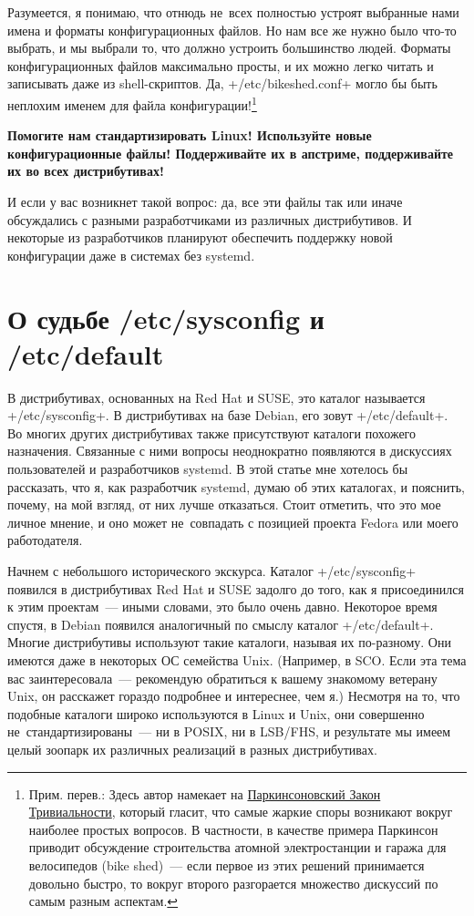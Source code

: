 \documentclass[10pt,oneside,a4paper]{article}
\begin{document}
Разумеется, я понимаю, что отнюдь не~всех полностью устроят выбранные нами имена
и форматы конфигурационных файлов. Но нам все же нужно было что-то выбрать, и мы
выбрали то, что должно устроить большинство людей. Форматы конфигурационных
файлов максимально просты, и их можно легко читать и записывать даже из
shell-скриптов. Да, +/etc/bikeshed.conf+ могло бы быть неплохим именем
для файла конфигурации!\footnote{Прим. перев.: Здесь автор намекает на
\href{http://en.wikipedia.org/wiki/Parkinson's_Law_of_Triviality}{Паркинсоновский
Закон Тривиальности}, который гласит, что самые жаркие споры возникают вокруг
наиболее простых вопросов. В частности, в качестве примера Паркинсон приводит
обсуждение строительства атомной электростанции и гаража для велосипедов (bike
shed)~--- если первое из этих решений принимается довольно быстро, то вокруг
второго разгорается множество дискуссий по самым разным аспектам.}

\textbf{Помогите нам стандартизировать Linux! Используйте новые конфигурационные
файлы! Поддерживайте их в апстриме, поддерживайте их во всех дистрибутивах!}

И если у вас возникнет такой вопрос: да, все эти файлы так или иначе
обсуждались с разными разработчиками из различных дистрибутивов. И некоторые из
разработчиков планируют обеспечить поддержку новой конфигурации даже в
системах без systemd.

\section{О судьбе /etc/sysconfig и /etc/default}

В дистрибутивах, основанных на Red Hat и SUSE, это каталог называется
+/etc/sysconfig+. В дистрибутивах на базе Debian, его зовут +/etc/default+.
Во многих других дистрибутивах также присутствуют каталоги похожего назначения.
Связанные с ними вопросы неоднократно появляются в дискуссиях пользователей и
разработчиков systemd. В этой статье мне хотелось бы рассказать, что я, как
разработчик systemd, думаю об этих каталогах, и пояснить, почему, на мой взгляд,
от них лучше отказаться. Стоит отметить, что это мое личное мнение, и оно
может не~совпадать с позицией проекта Fedora или моего работодателя.

Начнем с небольшого исторического экскурса. Каталог +/etc/sysconfig+ появился в
дистрибутивах Red Hat и SUSE задолго до того, как я присоединился к этим
проектам~--- иными словами, это было очень давно. 
Некоторое время спустя, в Debian появился аналогичный по смыслу каталог
+/etc/default+. Многие дистрибутивы используют такие каталоги, называя их
по-разному. Они имеются даже в некоторых ОС семейства Unix. (Например, в SCO.
Если эта тема вас заинтересовала~--- рекомендую обратиться к вашему знакомому
ветерану Unix, он расскажет гораздо подробнее и интереснее, чем я.) Несмотря на
то, что подобные каталоги широко используются в Linux и Unix, они совершенно
не~стандартизированы~--- ни в POSIX, ни в LSB/FHS, и результате мы имеем целый
зоопарк их различных реализаций в разных дистрибутивах.
\end{document}
